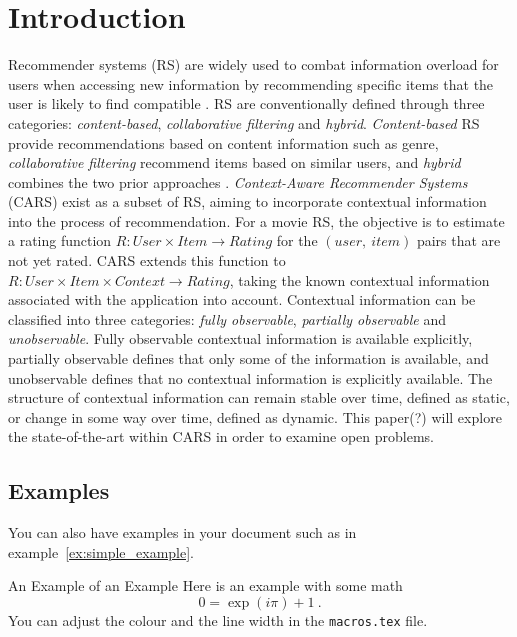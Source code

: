 \chapter{Introduction}\label{ch:introduction}
Recommender systems (RS) are widely used to combat information overload for users when accessing new information by recommending specific items that the user is likely to find compatible \cite{YouTubeNeural,IndustryPerspective}.
RS are conventionally defined through three categories: \textit{content-based}, \textit{collaborative filtering} and \textit{hybrid}.
\textit{Content-based} RS provide recommendations based on content information such as genre, \textit{collaborative filtering} recommend items based on similar users, and \textit{hybrid} combines the two prior approaches \cite{ContextSurvey2020}.
\textit{Context-Aware Recommender Systems} (CARS) exist as a subset of RS, aiming to incorporate contextual information into the process of recommendation.
For a movie RS, the objective is to estimate a rating function $R: User \times Item \rightarrow Rating$ for the $(user, \ item)$ pairs that are not yet rated\cite[p.~191-227]{RecommenderHandbook2015}.
CARS extends this function to $R: User \times Item \times Context \rightarrow Rating$, taking the known contextual information associated with the application into account.
Contextual information can be classified into three categories: \textit{fully observable}, \textit{partially observable} and \textit{unobservable}.
Fully observable contextual information is available explicitly, partially observable defines that only some of the information is available, and unobservable defines that no contextual information is explicitly available.
The structure of contextual information can remain stable over time, defined as static, or change in some way over time, defined as dynamic.
This paper(?) will explore the state-of-the-art within CARS in order to examine open problems.

\section{Examples}
You can also have examples in your document such as in example~\ref{ex:simple_example}.
\begin{example}{An Example of an Example}
  \label{ex:simple_example}
  Here is an example with some math
  \begin{equation}
    0 = \exp(i\pi)+1\ .
  \end{equation}
  You can adjust the colour and the line width in the {\tt macros.tex} file.
\end{example}

